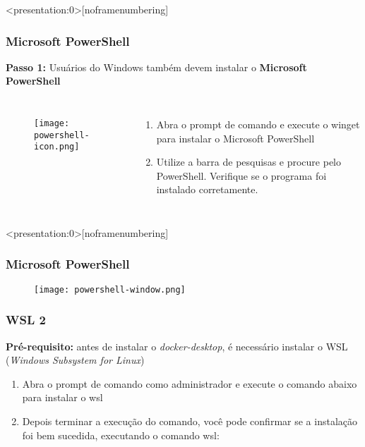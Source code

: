\documentclass[t, 10pt, aspectratio=169, table, x11names]{beamer}
\begin{document}
	\begin{frame}<presentation:0>[noframenumbering]
		\frametitle{Microsoft PowerShell}
		\textbf{Passo 1:} Usuários do Windows também devem instalar o \textbf{Microsoft PowerShell}
		\vspace{0.6cm}
		\begin{columns}
			\begin{figure}[h]
				\texttt{[image: powershell-icon.png]}
			\end{figure}
			\begin{enumerate}
				\item Abra o prompt de comando e execute o winget para instalar o Microsoft PowerShell
				
				\vspace{0.4cm}
				\item Utilize a barra de pesquisas e procure pelo PowerShell. Verifique se o programa foi instalado corretamente.
			\end{enumerate}
		\end{columns}
	\end{frame}
	
	\begin{frame}<presentation:0>[noframenumbering]
		\frametitle{Microsoft PowerShell}
		\vspace{0.5cm}
		\begin{figure}[h]
			\texttt{[image: powershell-window.png]}
		\end{figure}
	\end{frame}

	\begin{frame}
		\frametitle{WSL 2}
		\textbf{Pré-requisito:} antes de instalar o \textit{docker-desktop}, é necessário instalar o WSL (\textit{Windows Subsystem for Linux})
		\begin{enumerate}
			\item Abra o prompt de comando como administrador e execute o comando abaixo para instalar o wsl
			
			\vspace{0.4cm}
			\item Depois terminar a execução do comando, você pode confirmar se a instalação foi bem sucedida, executando o comando wsl:
			
		\end{enumerate}
	\end{frame}
	
\end{document}
